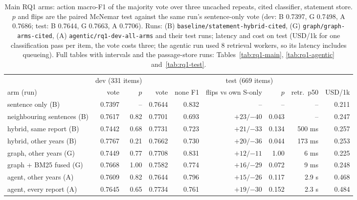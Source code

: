 \documentclass[11pt]{article}
\newcommand{\run}[1]{\nolinkurl{#1}}
\begin{document}
\begin{table}[t]
\centering\scriptsize
\setlength{\tabcolsep}{4.5pt}
\begin{tabular}{@{}lrrrrrrrr@{}}
\toprule
 & \multicolumn{2}{c}{dev (331 items)} & \multicolumn{6}{c}{test (669 items)} \\
\cmidrule(lr){2-3}\cmidrule(l){4-9}
arm (run) & vote & $p$ & vote & none F1 & flips vs own S-only & $p$ & retr.\ p50 & USD/1k \\
\midrule
sentence only (B) & 0.7397 & -- & 0.7644 & 0.832 & -- & -- & -- & 0.211 \\
neighbouring sentences (B) & 0.7617 & 0.82 & 0.7701 & 0.693 & $+23 / {-40}$ & 0.043 & -- & 0.247 \\
hybrid, same report (B) & 0.7442 & 0.68 & 0.7731 & 0.723 & $+21 / {-33}$ & 0.134 & 500 ms & 0.257 \\
hybrid, other years (B) & 0.7767 & 0.21 & 0.7662 & 0.730 & $+20 / {-36}$ & 0.044 & 173 ms & 0.253 \\
graph, other years (G) & 0.7449 & 0.77 & 0.7708 & 0.831 & $+12 / {-11}$ & 1.00 & 6 ms & 0.225 \\
graph + BM25 fused (G) & 0.7668 & 1.00 & 0.7582 & 0.774 & $+16 / {-29}$ & 0.072 & 9 ms & 0.248 \\
agent, other years (A) & 0.7609 & 0.82 & 0.7644 & 0.796 & $+15 / {-26}$ & 0.117 & 2.9 s & 0.468 \\
agent, every report (A) & 0.7645 & 0.65 & 0.7734 & 0.761 & $+19 / {-30}$ & 0.152 & 2.3 s & 0.484 \\
\bottomrule
\end{tabular}
\caption{Main RQ1 arms: action macro-F1 of the majority vote over three uncached repeats, cited classifier, statement store. $p$ and flips are the paired McNemar test against the same run's sentence-only vote (dev: B 0.7397, G 0.7498, A 0.7686; test: B 0.7644, G 0.7663, A 0.7706). Runs: (B) \run{baseline/statement-hybrid-cited}, (G) \run{graph/graph-arms-cited}, (A) \run{agentic/rq1-dev-all-arms} and their test runs; latency and cost on test (USD/1k for one classification pass per item, the vote costs three; the agentic run used 8 retrieval workers, so its latency includes queueing). Full tables with intervals and the passage-store runs: Tables~\ref{tab:rq1-main}, \ref{tab:rq1-agentic} and~\ref{tab:rq1-test}.}
\label{tab:rq1-summary}
\end{table}
\end{document}
